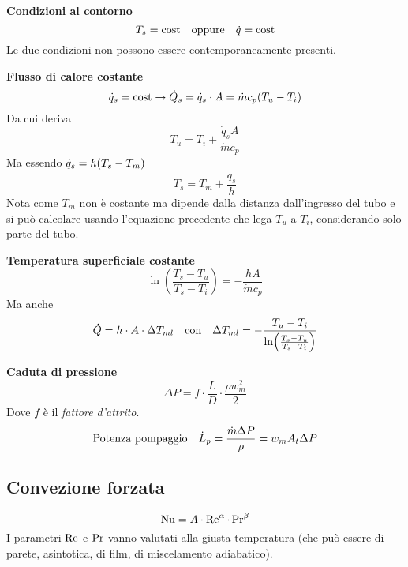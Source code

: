 \textbf{Condizioni al contorno}\\
\[ T_s = \text{cost} \qq{oppure} \dot{q} = \text{cost} \]
Le due condizioni non possono essere contemporaneamente presenti.

\textbf{Flusso di calore costante}\\
\[ \dot{q}_s = \text{cost} \rightarrow \dot{Q}_s = \dot{q}_s \cdot A = \dot{m} c_p \qty(T_u - T_i) \]
Da cui deriva 
\[ T_u = T_i + \frac{\dot{q}_s A}{\dot{m} c_p} \]
Ma essendo $\dot{q}_s = h \qty(T_s - T_m)$
\[ T_s = T_m + \frac{\dot{q}_s}{h} \]
Nota come $T_m$ non è costante ma dipende dalla distanza dall'ingresso del tubo e si può calcolare usando l'equazione precedente che lega $T_u$ a $T_i$, considerando solo parte del tubo.

\textbf{Temperatura superficiale costante}\\
\[ \ln(\frac{T_s - T_u}{T_s - T_i}) = - \frac{h A}{\dot{m} c_p} \]
Ma anche
\[ \dot{Q} = h \cdot A \cdot \Delta T_{ml} \qq{con} \Delta T_{ml} = - \frac{T_u - T_i}{\ln(\frac{T_s - T_u}{T_s - T_i})} \]

\textbf{Caduta di pressione}\\
\[ \Delta P = f \cdot \frac{L}{D} \cdot \frac{\rho w_m^2}{2} \]
Dove $f$ è il \emph{fattore d'attrito}.
\[ \qq*{Potenza pompaggio} \dot{L}_p = \frac{\dot{m} \Delta P}{\rho} = w_m A_t \Delta P \]

\subsection{Convezione forzata}
\[ \operatorname{Nu} = A \cdot \operatorname{Re}^\alpha \cdot \operatorname{Pr}^\beta \]
I parametri $\operatorname{Re}$ e $\operatorname{Pr}$ vanno valutati alla giusta temperatura (che può essere di parete, asintotica, di film, di miscelamento adiabatico).

